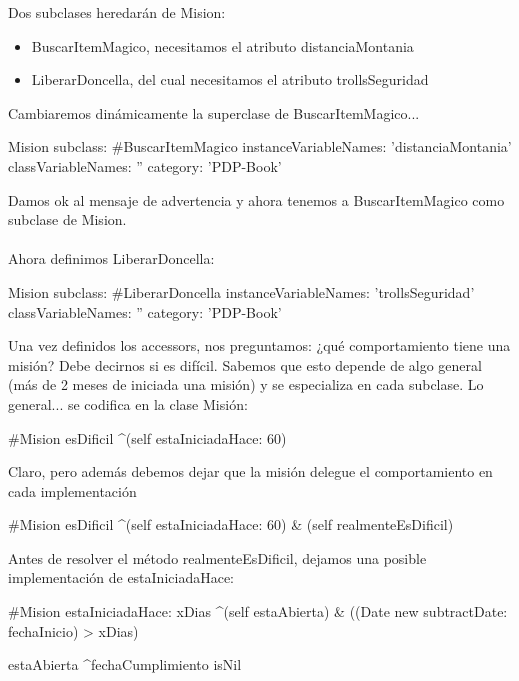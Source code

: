 \documentclass[a4paper,12pt]{book}
\begin{document}
Dos subclases heredarán de Mision: 

\begin{itemize}
 \item BuscarItemMagico, necesitamos el atributo distanciaMontania
 \item LiberarDoncella, del cual necesitamos el atributo trollsSeguridad
\end{itemize}

Cambiaremos dinámicamente la superclase de BuscarItemMagico...

\begin{code}
Mision subclass: #BuscarItemMagico
	instanceVariableNames: 'distanciaMontania'
	classVariableNames: ''
	category: 'PDP-Book'
\end{code}

Damos ok al mensaje de advertencia y ahora tenemos a BuscarItemMagico como subclase de Mision.
\\
\\
Ahora definimos LiberarDoncella:

\begin{code}
Mision subclass: #LiberarDoncella
	instanceVariableNames: 'trollsSeguridad'
	classVariableNames: ''
	category: 'PDP-Book'
\end{code}

Una vez definidos los accessors, nos preguntamos: ¿qué comportamiento tiene una misión? Debe decirnos
si es difícil. Sabemos que esto depende de algo general (más de 2 meses de iniciada una misión) y se
especializa en cada subclase. Lo general... se codifica en la clase Misión:

\begin{code}
#Mision
esDificil
	^(self estaIniciadaHace: 60)
\end{code}

Claro, pero además debemos dejar que la misión delegue el comportamiento en cada implementación

\begin{code}
#Mision
esDificil
	^(self estaIniciadaHace: 60) & (self realmenteEsDificil)
\end{code}

Antes de resolver el método realmenteEsDificil, dejamos una posible implementación de estaIniciadaHace:

\begin{code}
#Mision
estaIniciadaHace: xDias
      ^(self estaAbierta) & ((Date new subtractDate: fechaInicio) > xDias)
      
estaAbierta
      ^fechaCumplimiento isNil       
\end{code}
\end{document}
